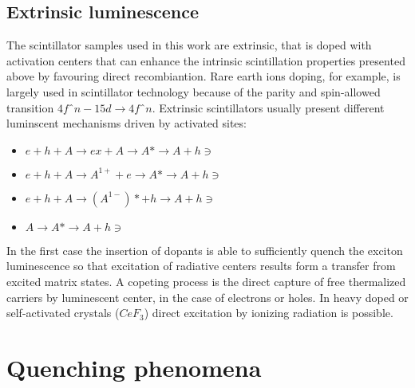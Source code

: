 \subsection{Extrinsic luminescence}

The scintillator samples used in this work are extrinsic, that is doped with activation centers that can enhance the intrinsic scintillation properties presented above by favouring direct recombiantion.
Rare earth ions doping, for example, is largely used in scintillator technology because of the parity and spin-allowed transition $4fˆ{n-1}5d\rightarrow 4fˆ{n}$. 
Extrinsic scintillators usually present different luminscent mechanisms driven by activated sites\cite{Lecoq2006}:
\begin{itemize}
\item $e + h + A \rightarrow ex + A \rightarrow A* \rightarrow A + h\ni$
\item $e + h + A \rightarrow A^{1+} + e \rightarrow A* \rightarrow A + h\ni$
\item $e + h + A \rightarrow (A^{1-})* + h \rightarrow A + h\ni$
\item $A \rightarrow A* \rightarrow A + h\ni$
\end{itemize}
In the first case the insertion of dopants is able to sufficiently quench the exciton luminescence so that excitation of radiative centers results form a transfer from excited matrix states.
A copeting process is the direct capture of free thermalized carriers by luminescent center, in the case of electrons or holes.
In heavy doped or self-activated crystals ($CeF_{3}$) direct excitation by ionizing radiation is possible.


\section{Quenching phenomena}


